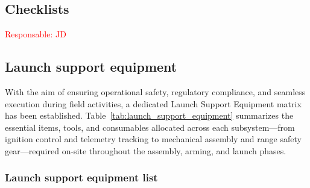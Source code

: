 \documentclass[11pt, a4paper]{article} %
\begin{document}
\subsection{Checklists} \textcolor{red}{Responsable: JD}

\subsection{Launch support equipment} 

With the aim of ensuring operational safety, regulatory compliance, and seamless execution during field activities, a dedicated Launch Support Equipment matrix has been established. Table~\ref{tab:launch_support_equipment} summarizes the essential items, tools, and consumables allocated across each subsystem—from ignition control and telemetry tracking to mechanical assembly and range safety gear—required on-site throughout the assembly, arming, and launch phases.
\subsubsection{Launch support equipment list} 

\end{document}
